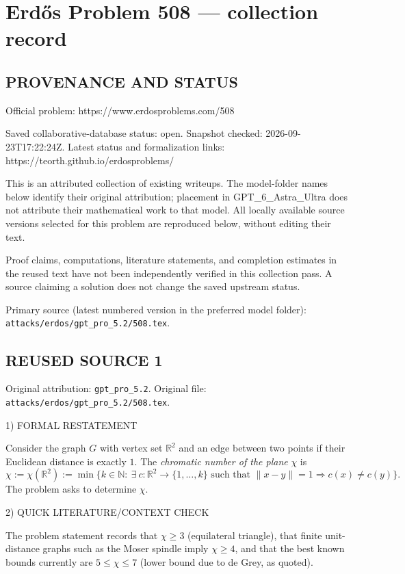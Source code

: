 \section*{Erd\H{o}s Problem 508 --- collection record}

\subsection*{PROVENANCE AND STATUS}
Official problem: https://www.erdosproblems.com/508

Saved collaborative-database status: open.
Snapshot checked: 2026-09-23T17:22:24Z.
Latest status and formalization links: https://teorth.github.io/erdosproblems/

This is an attributed collection of existing writeups. The model-folder names below identify their original attribution; placement in GPT\_6\_Astra\_Ultra does not attribute their mathematical work to that model. All locally available source versions selected for this problem are reproduced below, without editing their text.

Proof claims, computations, literature statements, and completion estimates in the reused text have not been independently verified in this collection pass. A source claiming a solution does not change the saved upstream status.

Primary source (latest numbered version in the preferred model folder): \texttt{attacks/erdos/gpt\_pro\_5.2/508.tex}.

\subsection*{REUSED SOURCE 1}
Original attribution: \texttt{gpt\_pro\_5.2}.
Original file: \texttt{attacks/erdos/gpt\_pro\_5.2/508.tex}.


1) FORMAL RESTATEMENT

Consider the graph $G$ with vertex set $\mathbb R^2$ and an edge between two points if their Euclidean distance is exactly $1$.
The \emph{chromatic number of the plane} $\chi$ is
\[
\chi := \chi(\mathbb R^2) := \min\big\{k\in\mathbb N:\ \exists\ c:\mathbb R^2\to\{1,\dots,k\}\text{ such that }\lVert x-y\rVert=1\Rightarrow c(x)\ne c(y)\big\}.
\]
The problem asks to determine $\chi$.

2) QUICK LITERATURE/CONTEXT CHECK

The problem statement records that $\chi\ge 3$ (equilateral triangle), that finite unit-distance graphs such as the Moser spindle imply $\chi\ge 4$, and that the best known bounds currently are $5\le \chi\le 7$ (lower bound due to de Grey, as quoted).

